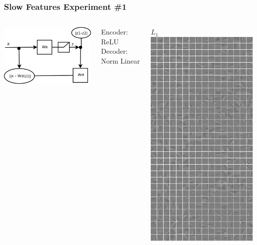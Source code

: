 \documentclass{beamer}
\begin{document}
\begin{frame}
\frametitle{Slow Features Experiment \#1}   
\begin{columns}[c]
    \column{2.5cm}
            \includegraphics[scale=0.3]{./figures/sfa2.png} 
            \vspace{0.1cm}
             \begin{tiny}
			 Encoder: ReLU \\
			 Decoder: Norm Linear
			\end{tiny}
    \column{3cm}
        \begin{center} 
        $L_1$
             \includegraphics[scale=0.3]{./figures/L1.png}

\end{center}
\end{columns}
\end{frame}
\end{document}
